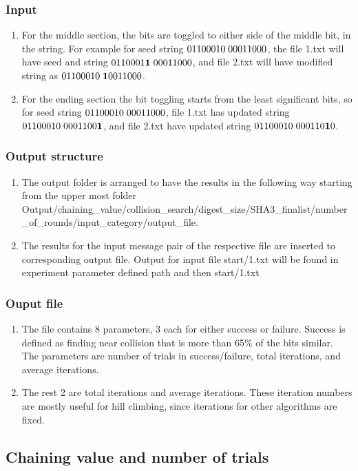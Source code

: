 \documentclass{beamer}
\begin{document}
\begin{frame}
\frametitle{Input}
\begin{enumerate}
\item For the middle section, the bits are toggled to either side of the middle bit, in the string. For example
for seed string $01100010\thickspace00011000$, the file 1.txt will have seed and string 
$0110001{\bf 1}\thickspace00011000$, and file 2.txt will have modified string as 
$01100010\thickspace{\bf 1}0011000$.
\item For the ending section the bit toggling starts from the least significant bits, so for seed string
$01100010\thickspace00011000$, file 1.txt has updated string $01100010\thickspace0001100{\bf 1}$, and 
file 2.txt have updated string $01100010\thickspace000110{\bf 1}0$.
\end{enumerate}
\end{frame}

\begin{frame}
\frametitle{Output structure}
\begin{enumerate}
\item The output folder is arranged to have the results in the following way starting from the upper most
folder 
Output/chaining\_value/collision\_search/digest\_size/SHA3\_finalist/number\_of\_rounds/input\_category/output\_file.
\item The results for the input message pair of the respective file are inserted to corresponding output file.
Output for input file start/1.txt will be found in experiment parameter defined path and then start/1.txt
\end{enumerate}
\end{frame}

\begin{frame}
\frametitle{Ouput file}
\begin{enumerate}
\item The file contains 8 parameters, 3 each for either success or failure. Success is defined as finding near 
collision that is more than 65\% of the bits similar. The parameters are number of trials in success/failure,
total iterations, and average iterations.
\item The rest 2 are total iterations and average iterations. These iteration numbers are mostly useful for
hill climbing, since iterations for other algorithms are fixed.
\end{enumerate}
\end{frame}

\subsection{Chaining value and number of trials}
\end{document}
